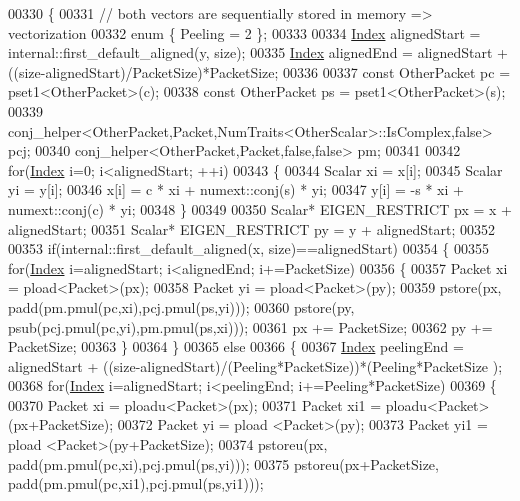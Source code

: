 \begin{DoxyCode}
00330   \{
00331     \textcolor{comment}{// both vectors are sequentially stored in memory => vectorization}
00332     \textcolor{keyword}{enum} \{ Peeling = 2 \};
00333 
00334     \hyperlink{namespace_eigen_a62e77e0933482dafde8fe197d9a2cfde}{Index} alignedStart = internal::first\_default\_aligned(y, size);
00335     \hyperlink{namespace_eigen_a62e77e0933482dafde8fe197d9a2cfde}{Index} alignedEnd = alignedStart + ((size-alignedStart)/PacketSize)*PacketSize;
00336 
00337     \textcolor{keyword}{const} OtherPacket pc = pset1<OtherPacket>(c);
00338     \textcolor{keyword}{const} OtherPacket ps = pset1<OtherPacket>(s);
00339     conj\_helper<OtherPacket,Packet,NumTraits<OtherScalar>::IsComplex,\textcolor{keyword}{false}> pcj;
00340     conj\_helper<OtherPacket,Packet,false,false> pm;
00341 
00342     \textcolor{keywordflow}{for}(\hyperlink{namespace_eigen_a62e77e0933482dafde8fe197d9a2cfde}{Index} i=0; i<alignedStart; ++i)
00343     \{
00344       Scalar xi = x[i];
00345       Scalar yi = y[i];
00346       x[i] =  c * xi + numext::conj(s) * yi;
00347       y[i] = -s * xi + numext::conj(c) * yi;
00348     \}
00349 
00350     Scalar* EIGEN\_RESTRICT px = x + alignedStart;
00351     Scalar* EIGEN\_RESTRICT py = y + alignedStart;
00352 
00353     \textcolor{keywordflow}{if}(internal::first\_default\_aligned(x, size)==alignedStart)
00354     \{
00355       \textcolor{keywordflow}{for}(\hyperlink{namespace_eigen_a62e77e0933482dafde8fe197d9a2cfde}{Index} i=alignedStart; i<alignedEnd; i+=PacketSize)
00356       \{
00357         Packet xi = pload<Packet>(px);
00358         Packet yi = pload<Packet>(py);
00359         pstore(px, padd(pm.pmul(pc,xi),pcj.pmul(ps,yi)));
00360         pstore(py, psub(pcj.pmul(pc,yi),pm.pmul(ps,xi)));
00361         px += PacketSize;
00362         py += PacketSize;
00363       \}
00364     \}
00365     \textcolor{keywordflow}{else}
00366     \{
00367       \hyperlink{namespace_eigen_a62e77e0933482dafde8fe197d9a2cfde}{Index} peelingEnd = alignedStart + ((size-alignedStart)/(Peeling*PacketSize))*(Peeling*PacketSize
      );
00368       \textcolor{keywordflow}{for}(\hyperlink{namespace_eigen_a62e77e0933482dafde8fe197d9a2cfde}{Index} i=alignedStart; i<peelingEnd; i+=Peeling*PacketSize)
00369       \{
00370         Packet xi   = ploadu<Packet>(px);
00371         Packet xi1  = ploadu<Packet>(px+PacketSize);
00372         Packet yi   = pload <Packet>(py);
00373         Packet yi1  = pload <Packet>(py+PacketSize);
00374         pstoreu(px, padd(pm.pmul(pc,xi),pcj.pmul(ps,yi)));
00375         pstoreu(px+PacketSize, padd(pm.pmul(pc,xi1),pcj.pmul(ps,yi1)));

\end{DoxyCode}
